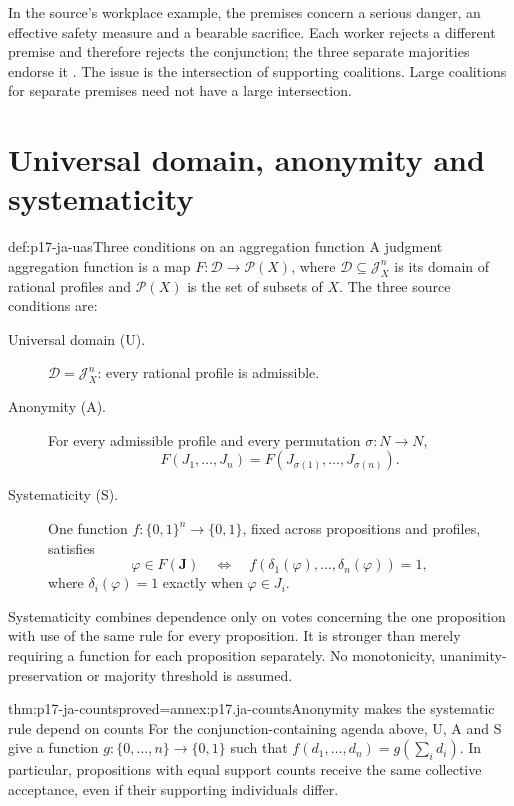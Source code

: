 In the source's workplace example, the premises concern a serious danger, an
effective safety measure and a bearable sacrifice. Each worker rejects a
different premise and therefore rejects the conjunction; the three separate
majorities endorse it \cite[pp.~7--8]{ListPettit2001JudgmentPreprint}. The issue
is the intersection of supporting coalitions. Large coalitions for separate
premises need not have a large intersection.

\section{Universal domain, anonymity and systematicity}
\label{sec:p17-ja-conditions}

\begin{hbdefinition}{def:p17-ja-uas}{Three conditions on an aggregation function}
A judgment aggregation function is a map
\(F:\mathcal D\to\mathcal P(X)\), where
\(\mathcal D\subseteq\mathcal J_X^n\) is its domain of rational profiles
and \(\mathcal P(X)\) is the set of subsets of \(X\).
The three source conditions are:
\begin{description}
\item[Universal domain (U).] \(\mathcal D=\mathcal J_X^n\): every rational
      profile is admissible.
\item[Anonymity (A).] For every admissible profile and every permutation
      \(\sigma:N\to N\),
      \[
       F(J_1,\ldots,J_n)=F(J_{\sigma(1)},\ldots,J_{\sigma(n)}).
      \]
\item[Systematicity (S).] One function \(f:\{0,1\}^n\to\{0,1\}\), fixed
      across propositions and profiles, satisfies
      \[
       \varphi\in F(\mathbf J)
       \quad\Longleftrightarrow\quad
       f(\delta_1(\varphi),\ldots,\delta_n(\varphi))=1,
      \]
      where \(\delta_i(\varphi)=1\) exactly when \(\varphi\in J_i\).
\end{description}
Systematicity combines dependence only on votes concerning the one proposition
with use of the same rule for every proposition. It is stronger than merely
requiring a function for each proposition separately. No monotonicity,
unanimity-preservation or majority threshold is assumed.
\end{hbdefinition}

\begin{hblemma}{thm:p17-ja-counts}{proved=annex:p17.ja-counts}{Anonymity makes the systematic rule depend on counts}
For the conjunction-containing agenda above, U, A and S give a function
\(g:\{0,\ldots,n\}\to\{0,1\}\) such
that \(f(d_1,\ldots,d_n)=g(\sum_i d_i)\). In particular, propositions with
equal support counts receive the same collective acceptance, even if their
supporting individuals differ.
\end{hblemma}

